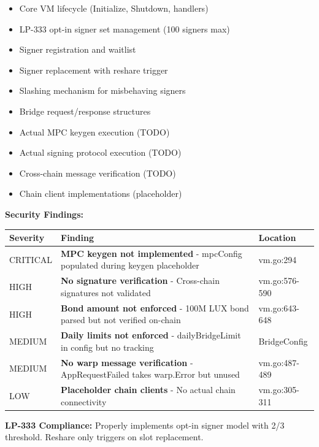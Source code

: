 \documentclass[
]{article}
\newcounter{none} %
\providecommand{\tightlist}{%
  \setlength{\itemsep}{0pt}\setlength{\parskip}{0pt}}
\begin{document}
\begin{itemize}
\tightlist
\item[$\boxtimes$]
  Core VM lifecycle (Initialize, Shutdown, handlers)
\item[$\boxtimes$]
  LP-333 opt-in signer set management (100 signers max)
\item[$\boxtimes$]
  Signer registration and waitlist
\item[$\boxtimes$]
  Signer replacement with reshare trigger
\item[$\boxtimes$]
  Slashing mechanism for misbehaving signers
\item[$\boxtimes$]
  Bridge request/response structures
\item[$\square$]
  Actual MPC keygen execution (TODO)
\item[$\square$]
  Actual signing protocol execution (TODO)
\item[$\square$]
  Cross-chain message verification (TODO)
\item[$\square$]
  Chain client implementations (placeholder)
\end{itemize}

\textbf{Security Findings:}

{\def\LTcaptype{none} %
\begin{longtable}[]{@{}lll@{}}
\toprule\noalign{}
Severity & Finding & Location \\
\midrule\noalign{}
\endhead
\bottomrule\noalign{}
\endlastfoot
CRITICAL & \textbf{MPC keygen not implemented} - mpcConfig populated
during keygen placeholder & vm.go:294 \\
HIGH & \textbf{No signature verification} - Cross-chain signatures not
validated & vm.go:576-590 \\
HIGH & \textbf{Bond amount not enforced} - 100M LUX bond parsed but not
verified on-chain & vm.go:643-648 \\
MEDIUM & \textbf{Daily limits not enforced} - dailyBridgeLimit in config
but no tracking & BridgeConfig \\
MEDIUM & \textbf{No warp message verification} - AppRequestFailed takes
warp.Error but unused & vm.go:487-489 \\
LOW & \textbf{Placeholder chain clients} - No actual chain connectivity
& vm.go:305-311 \\
\end{longtable}
}

\textbf{LP-333 Compliance:} Properly implements opt-in signer model with
2/3 threshold. Reshare only triggers on slot replacement.
\end{document}
